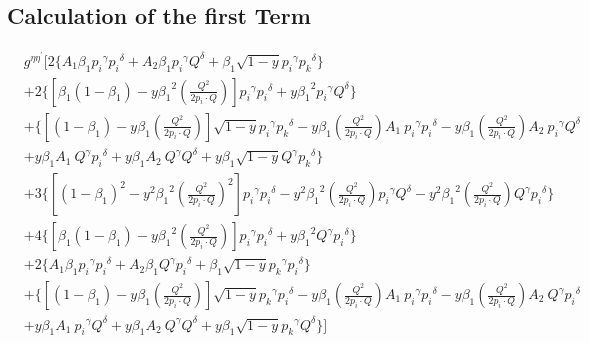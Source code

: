 \subsection*{Calculation of the first Term}

\begin{equation}
\begin{split} 
& g^{{{\eta}}{{\eta}^{\prime}}}[2\lbrace A_1\beta_1 {p_i}^{{\gamma}}{{p_i}^{{\delta}}}+A_2\beta_1 {p_i}^{{\gamma}}{{Q}^{{\delta}}}+\beta_1 \sqrt{1-y}{p_i}^{{\gamma}}{{p_k}^{{\delta}}} \rbrace \\&
+2\lbrace [\beta_1(1-\beta_1)-y {\beta_1}^2 (\frac{Q^2}{2p_i \cdot Q})] {p_i}^{{\gamma}}{p_i}^{{\delta}}+y {\beta_1}^2 {p_i}^{{\gamma}}{Q}^{{\delta}} \rbrace\\
&+\lbrace [(1-\beta_1)-y\beta_1 (\frac{Q^2}{2p_i \cdot Q})] \sqrt{1-y}{p_i}^{{\gamma}}{{p_k}^{{\delta}}}-y {\beta_1} (\frac{Q^2}{2p_i \cdot Q}) A_1 \:{p_i}^{{\gamma}}{p_i}^{{\delta}}
-y {\beta_1} (\frac{Q^2}{2p_i \cdot Q}) A_2\: {p_i}^{{\gamma}}{Q}^{{\delta}}\\
&+y {\beta_1} A_1 \:{Q}^{{\gamma}}{p_i}^{{\delta}}+y {\beta_1} A_2 \:{Q}^{{\gamma}}{Q}^{{\delta}}+y {\beta_1}\sqrt{1-y}{Q}^{{\gamma}}{{p_k}^{{\delta}}} \rbrace \\
&+3\lbrace [(1-\beta_1)^2-y^2 {\beta_1}^2 (\frac{Q^2}{2p_i \cdot Q})^2] {p_i}^{{\gamma}}{p_i}^{{\delta}}-y^2 {\beta_1}^2 (\frac{Q^2}{2p_i \cdot Q}){p_i}^{{\gamma}}{Q}^{{\delta}}-y^2 {\beta_1}^2 (\frac{Q^2}{2p_i \cdot Q}){Q}^{{\gamma}}{p_i}^{{\delta}} \rbrace\\
&+4\lbrace [\beta_1(1-\beta_1)-y {\beta_1}^2 (\frac{Q^2}{2p_i \cdot Q})] {p_i}^{{\gamma}}{p_i}^{{\delta}}+y {\beta_1}^2 {Q}^{{\gamma}}{p_i}^{{\delta}} \rbrace\\
&+2\lbrace A_1\beta_1 {p_i}^{{\gamma}}{{p_i}^{{\delta}}}+A_2\beta_1 {Q}^{{\gamma}}{{p_i}^{{\delta}}}+\beta_1 \sqrt{1-y}{p_k}^{{\gamma}}{{p_i}^{{\delta}}} \rbrace \\
&+\lbrace [(1-\beta_1)-y\beta_1 (\frac{Q^2}{2p_i \cdot Q})] \sqrt{1-y}{p_k}^{{\gamma}}{{p_i}^{{\delta}}}-y {\beta_1} (\frac{Q^2}{2p_i \cdot Q}) A_1 \:{p_i}^{{\gamma}}{p_i}^{{\delta}}
-y {\beta_1} (\frac{Q^2}{2p_i \cdot Q}) A_2\: {Q}^{{\gamma}}{p_i}^{{\delta}}\\
&+y {\beta_1} A_1 \:{p_i}^{{\gamma}}{Q}^{{\delta}}+y {\beta_1} A_2 \:{Q}^{{\gamma}}{Q}^{{\delta}}+y {\beta_1}\sqrt{1-y}{p_k}^{{\gamma}}{{Q}^{{\delta}}} \rbrace]\\
\end{split}
\end{equation}

